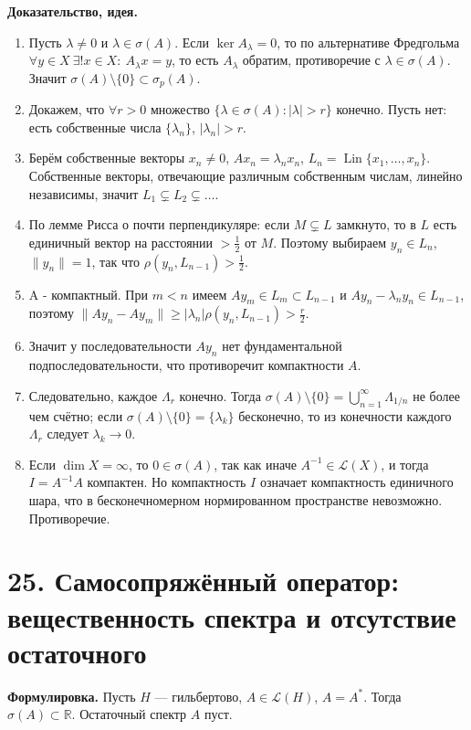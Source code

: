 \documentclass[10pt,a4paper]{article}
\newcommand{\Lin}{\operatorname{Lin}}
\begin{document}
	\textbf{Доказательство, идея.}
	\begin{enumerate}
		\item Пусть $\lambda\ne0$ и $\lambda\in\sigma(A)$. Если $\ker A_\lambda=0$, то по альтернативе Фредгольма $\forall y\in X\ \exists!x\in X:\ A_\lambda x=y$, то есть $A_\lambda$ обратим, противоречие с $\lambda\in\sigma(A)$. Значит $\sigma(A)\setminus\{0\}\subset\sigma_p(A)$.

		\item Докажем, что $\forall r>0$ множество $\{\lambda\in\sigma(A):|\lambda|>r\}$ конечно. Пусть нет: есть собственные числа $\{ \lambda_n \}$, $|\lambda_n|>r$.

		\item Берём собственные векторы $x_n\ne0$, $Ax_n=\lambda_n x_n$, $L_n=\Lin\{x_1,\ldots,x_n\}$. Собственные векторы, отвечающие различным собственным числам, линейно независимы, значит $L_1\subsetneq L_2\subsetneq\ldots$.

		\item По лемме Рисса о почти перпендикуляре: если $M\subsetneq L$ замкнуто, то в $L$ есть единичный вектор на расстоянии $>\frac12$ от $M$. Поэтому выбираем $y_n\in L_n$, $\|y_n\|=1$, так что $\rho(y_n,L_{n-1})>\frac12$.

		\item A - компактный. При $m<n$ имеем $Ay_m\in L_m\subset L_{n-1}$ и $Ay_n-\lambda_n y_n\in L_{n-1}$, поэтому $\|Ay_n-Ay_m\|\ge |\lambda_n|\rho(y_n,L_{n-1})>\frac r2$.

		\item Значит у последовательности $Ay_n$ нет фундаментальной подпоследовательности, что противоречит компактности $A$.

		\item Следовательно, каждое $\Lambda_r$ конечно. Тогда $\sigma(A)\setminus\{0\}=\bigcup_{n=1}^{\infty}\Lambda_{1/n}$ не более чем счётно; если $\sigma(A)\setminus\{0\}=\{\lambda_k\}$ бесконечно, то из конечности каждого $\Lambda_r$ следует $\lambda_k\to0$.

		\item Если $\dim X = \infty$, то $0\in\sigma(A)$, так как иначе $A^{-1}\in\mathcal L(X)$, и тогда $I=A^{-1}A$ компактен. Но компактность $I$ означает компактность единичного шара, что в бесконечномерном нормированном пространстве невозможно. Противоречие.
	\end{enumerate}

	\section*{25. Самосопряжённый оператор: вещественность спектра и отсутствие остаточного}
	\textbf{Формулировка.} Пусть $H$ --- гильбертово, $A\in\mathcal L(H)$, $A=A^*$. Тогда $\sigma(A)\subset\mathbb R$. Остаточный спектр $A$ пуст.
\end{document}

